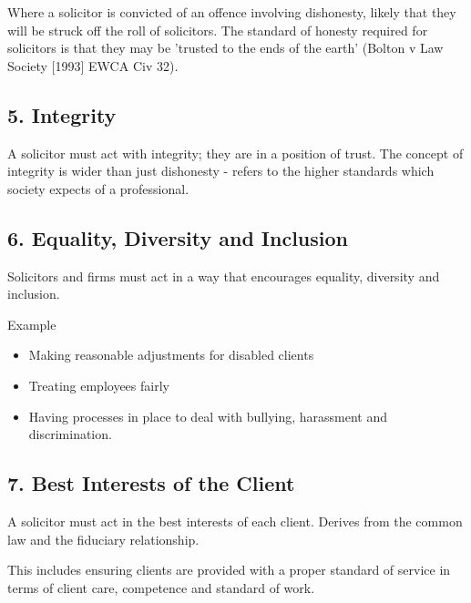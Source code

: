 \documentclass[
]{article}
\providecommand{\tightlist}{%
  \setlength{\itemsep}{0pt}\setlength{\parskip}{0pt}}
\newenvironment{env-4f1f1fac-cb83-4fe6-a11e-b3a07eb0c3eb}
{
    \savenotes\tcolorbox[blanker,breakable,left=5pt,borderline west={2pt}{-4pt}{purple}]
}
{
    \endtcolorbox\spewnotes
}
\begin{document}
Where a solicitor is convicted of an offence involving dishonesty,
likely that they will be struck off the roll of solicitors. The standard
of honesty required for solicitors is that they may be 'trusted to the
ends of the earth' (Bolton v Law Society {[}1993{]} EWCA Civ 32).

\hypertarget{integrity}{%
\subsection{5. Integrity}\label{integrity}}

A solicitor must act with integrity; they are in a position of trust.
The concept of integrity is wider than just dishonesty - refers to the
higher standards which society expects of a professional.

\hypertarget{equality-diversity-and-inclusion}{%
\subsection{6. Equality, Diversity and
Inclusion}\label{equality-diversity-and-inclusion}}

Solicitors and firms must act in a way that encourages equality,
diversity and inclusion.

\begin{env-4f1f1fac-cb83-4fe6-a11e-b3a07eb0c3eb}

Example

\begin{itemize}
\tightlist
\item
  Making reasonable adjustments for disabled clients
\item
  Treating employees fairly
\item
  Having processes in place to deal with bullying, harassment and
  discrimination.
\end{itemize}

\end{env-4f1f1fac-cb83-4fe6-a11e-b3a07eb0c3eb}

\hypertarget{best-interests-of-the-client}{%
\subsection{7. Best Interests of the
Client}\label{best-interests-of-the-client}}

A solicitor must act in the best interests of each client. Derives from
the common law and the fiduciary relationship.

This includes ensuring clients are provided with a proper standard of
service in terms of client care, competence and standard of work.
\end{document}
